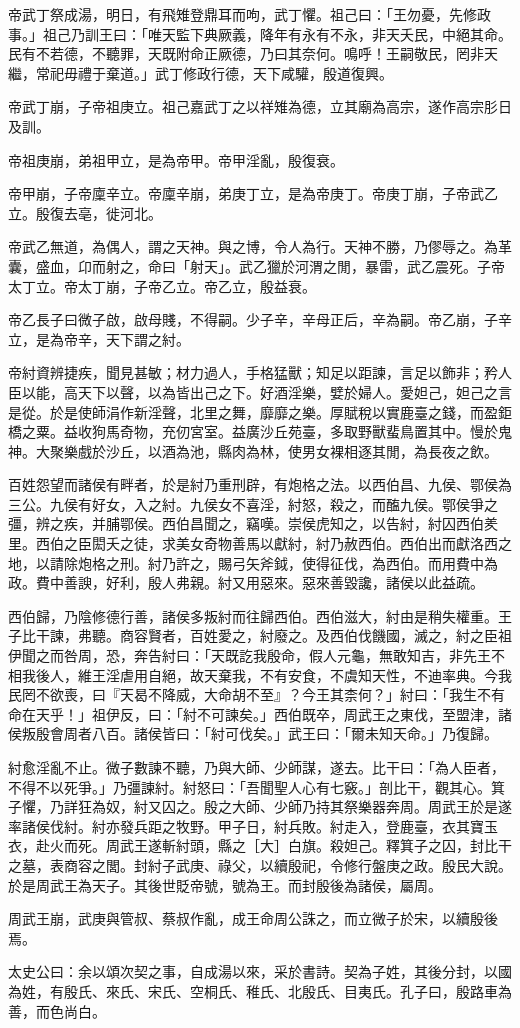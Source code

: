 \begin{pinyinscope}
帝武丁祭成湯，明日，有飛雉登鼎耳而呴，武丁懼。祖己曰：「王勿憂，先修政事。」祖己乃訓王曰：「唯天監下典厥義，降年有永有不永，非天夭民，中絕其命。民有不若德，不聽罪，天既附命正厥德，乃曰其奈何。鳴呼！王嗣敬民，罔非天繼，常祀毋禮于棄道。」武丁修政行德，天下咸驩，殷道復興。

帝武丁崩，子帝祖庚立。祖己嘉武丁之以祥雉為德，立其廟為高宗，遂作高宗肜日及訓。

帝祖庚崩，弟祖甲立，是為帝甲。帝甲淫亂，殷復衰。

帝甲崩，子帝廩辛立。帝廩辛崩，弟庚丁立，是為帝庚丁。帝庚丁崩，子帝武乙立。殷復去亳，徙河北。

帝武乙無道，為偶人，謂之天神。與之博，令人為行。天神不勝，乃僇辱之。為革囊，盛血，卬而射之，命曰「射天」。武乙獵於河渭之閒，暴雷，武乙震死。子帝太丁立。帝太丁崩，子帝乙立。帝乙立，殷益衰。

帝乙長子曰微子啟，啟母賤，不得嗣。少子辛，辛母正后，辛為嗣。帝乙崩，子辛立，是為帝辛，天下謂之紂。

帝紂資辨捷疾，聞見甚敏；材力過人，手格猛獸；知足以距諫，言足以飾非；矜人臣以能，高天下以聲，以為皆出己之下。好酒淫樂，嬖於婦人。愛妲己，妲己之言是從。於是使師涓作新淫聲，北里之舞，靡靡之樂。厚賦稅以實鹿臺之錢，而盈鉅橋之粟。益收狗馬奇物，充仞宮室。益廣沙丘苑臺，多取野獸蜚鳥置其中。慢於鬼神。大聚樂戲於沙丘，以酒為池，縣肉為林，使男女裸相逐其閒，為長夜之飲。

百姓怨望而諸侯有畔者，於是紂乃重刑辟，有炮格之法。以西伯昌、九侯、鄂侯為三公。九侯有好女，入之紂。九侯女不喜淫，紂怒，殺之，而醢九侯。鄂侯爭之彊，辨之疾，并脯鄂侯。西伯昌聞之，竊嘆。崇侯虎知之，以告紂，紂囚西伯羑里。西伯之臣閎夭之徒，求美女奇物善馬以獻紂，紂乃赦西伯。西伯出而獻洛西之地，以請除炮格之刑。紂乃許之，賜弓矢斧鉞，使得征伐，為西伯。而用費中為政。費中善諛，好利，殷人弗親。紂又用惡來。惡來善毀讒，諸侯以此益疏。

西伯歸，乃陰修德行善，諸侯多叛紂而往歸西伯。西伯滋大，紂由是稍失權重。王子比干諫，弗聽。商容賢者，百姓愛之，紂廢之。及西伯伐饑國，滅之，紂之臣祖伊聞之而咎周，恐，奔告紂曰：「天既訖我殷命，假人元龜，無敢知吉，非先王不相我後人，維王淫虐用自絕，故天棄我，不有安食，不虞知天性，不迪率典。今我民罔不欲喪，曰『天曷不降威，大命胡不至』？今王其柰何？」紂曰：「我生不有命在天乎！」祖伊反，曰：「紂不可諫矣。」西伯既卒，周武王之東伐，至盟津，諸侯叛殷會周者八百。諸侯皆曰：「紂可伐矣。」武王曰：「爾未知天命。」乃復歸。

紂愈淫亂不止。微子數諫不聽，乃與大師、少師謀，遂去。比干曰：「為人臣者，不得不以死爭。」乃彊諫紂。紂怒曰：「吾聞聖人心有七竅。」剖比干，觀其心。箕子懼，乃詳狂為奴，紂又囚之。殷之大師、少師乃持其祭樂器奔周。周武王於是遂率諸侯伐紂。紂亦發兵距之牧野。甲子日，紂兵敗。紂走入，登鹿臺，衣其寶玉衣，赴火而死。周武王遂斬紂頭，縣之［大］白旗。殺妲己。釋箕子之囚，封比干之墓，表商容之閭。封紂子武庚、祿父，以續殷祀，令修行盤庚之政。殷民大說。於是周武王為天子。其後世貶帝號，號為王。而封殷後為諸侯，屬周。

周武王崩，武庚與管叔、蔡叔作亂，成王命周公誅之，而立微子於宋，以續殷後焉。

太史公曰：余以頌次契之事，自成湯以來，采於書詩。契為子姓，其後分封，以國為姓，有殷氏、來氏、宋氏、空桐氏、稚氏、北殷氏、目夷氏。孔子曰，殷路車為善，而色尚白。


\end{pinyinscope}